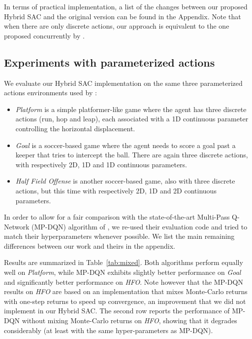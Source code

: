 \documentclass[letterpaper]{article} \usepackage{aaai20}  \usepackage{times}  \usepackage{helvet} \usepackage{courier}  \usepackage[hyphens]{url}  \usepackage{graphicx} \urlstyle{rm} \def\UrlFont{\rm}  \usepackage{graphicx}  \usepackage[section]{placeins}
\newcommand{\citet}{\cite}  \newcommand{\citep}{\cite} \DeclareMathOperator*{\softmax}{softmax}
\begin{document}
In terms of practical implementation, a list of the changes between our proposed Hybrid SAC and the original version can be found in the Appendix. Note that when there are only discrete actions, our approach is equivalent to the one proposed concurrently by \citet{christodoulou2019}.

\subsection{Experiments with parameterized actions}

We evaluate our Hybrid SAC implementation on the same three parameterized actions environments used by \citet{bester2019}:
\begin{itemize}
    \item {\em Platform} is a simple platformer-like game where the agent has three discrete actions (run, hop and leap), each associated with a 1D continuous parameter controlling the horizontal displacement.
    \item {\em Goal} is a soccer-based game where the agent needs to score a goal past a keeper that tries to intercept the ball. There are again three discrete actions, with respectively 2D, 1D and 1D continuous parameters.
    \item {\em Half Field Offense} is another soccer-based game, also with three discrete actions, but this time with respectively 2D, 1D and 2D continuous parameters.
\end{itemize}

In order to allow for a fair comparison with the state-of-the-art Multi-Pass Q-Network (MP-DQN) algorithm of \citet{bester2019}, we re-used their evaluation code and tried to match their hyperparameters whenever possible. We list the main remaining differences between our work and theirs in the appendix. 

Results are summarized in Table~\ref{tab:mixed}.
Both algorithms perform equally well on {\em Platform}, while MP-DQN exhibits slightly better performance on {\em Goal} and significantly better performance on {\em HFO}.
Note however that the MP-DQN results on {\em HFO} are based on an implementation that mixes Monte-Carlo returns with one-step returns to speed up convergence, an improvement that we did not implement in our Hybrid SAC.
The second row reports the performance of MP-DQN without mixing Monte-Carlo returns on {\em HFO}, showing that it degrades considerably (at least with the same hyper-parameters as MP-DQN).
\end{document}
